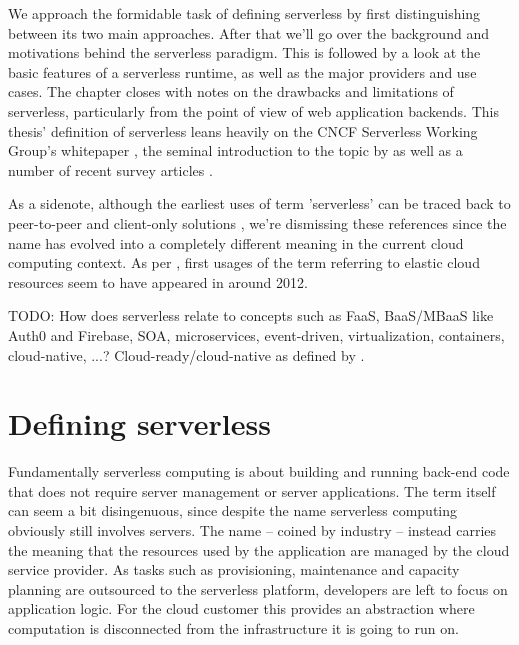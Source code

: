 \documentclass[utf8,english]{gradu3}
\begin{document}
We approach the formidable task of defining serverless by first distinguishing between its two main approaches. After that we'll go over the background and motivations behind the serverless paradigm. This is followed by a look at the basic features of a serverless runtime, as well as the major providers and use cases. The chapter closes with notes on the drawbacks and limitations of serverless, particularly from the point of view of web application backends. This thesis' definition of serverless leans heavily on the CNCF Serverless Working Group's whitepaper \parencite{cncf18serverlessWG}, the seminal introduction to the topic by \textcite{robert2016serverlessarchitectures} as well as a number of recent survey articles \parencite[e.g.][]{baldini17currentTrends,van2017spec,fox17}.

As a sidenote, although the earliest uses of term 'serverless' can be traced back to peer-to-peer and client-only solutions \parencite{fox17}, we're dismissing these references since the name has evolved into a completely different meaning in the current cloud computing context. As per \textcite{robert2016serverlessarchitectures}, first usages of the term referring to elastic cloud resources seem to have appeared in around 2012.

TODO: How does serverless relate to concepts such as FaaS, BaaS/MBaaS like Auth0 and Firebase, SOA, microservices, event-driven, virtualization, containers, cloud-native, ...? Cloud-ready/cloud-native as defined by \textcite{pozdniakova17cloudready}.

\section{Defining serverless}

Fundamentally serverless computing is about building and running back-end code that does not require server management or server applications. The term itself can seem a bit disingenuous, since despite the name serverless computing obviously still involves servers. The name -- coined by industry -- instead carries the meaning that the resources used by the application are managed by the cloud service provider. As tasks such as provisioning, maintenance and capacity planning are outsourced to the serverless platform, developers are left to focus on application logic. For the cloud customer this provides an abstraction where computation is disconnected from the infrastructure it is going to run on. \parencite{robert2016serverlessarchitectures,cncf18serverlessWG}
\end{document}
